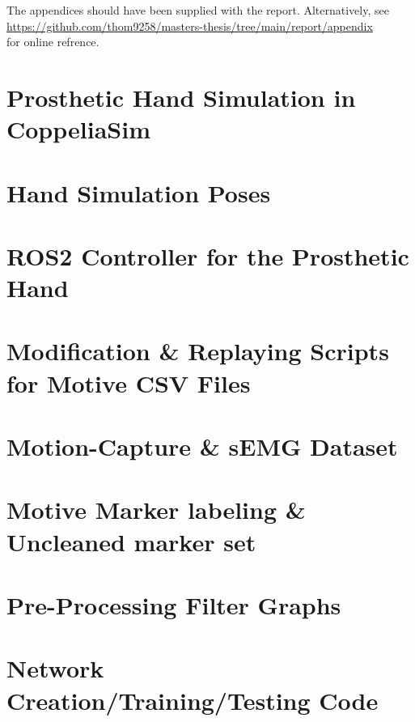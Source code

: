 \documentclass[a4paper, 12pt]{article}
\begin{document}
\printbibliography

\newpage
\listofappendices  %
\appendix %


The appendices should have been supplied with the report.
Alternatively, see \\
\url{https://github.com/thom9258/masters-thesis/tree/main/report/appendix} \\
for online refrence.

\section{Prosthetic Hand Simulation in CoppeliaSim}
\label{appendix:handsim}

\section{Hand Simulation Poses}
\label{appendix:handsim_poses}

\section{ROS2 Controller for the Prosthetic Hand}
\label{appendix:roscontrol}

\section{Modification \& Replaying Scripts for Motive CSV Files}
\label{appendix:motiveformatting}

\section{Motion-Capture \& sEMG Dataset}
\label{appendix:dataset}

\section{Motive Marker labeling \& Uncleaned marker set}
\label{appendix:motivefixing}

\section{Pre-Processing Filter Graphs}
\label{appendix:preprocessing}

\section{Network Creation/Training/Testing Code}
\label{appendix:networks}
\end{document}

